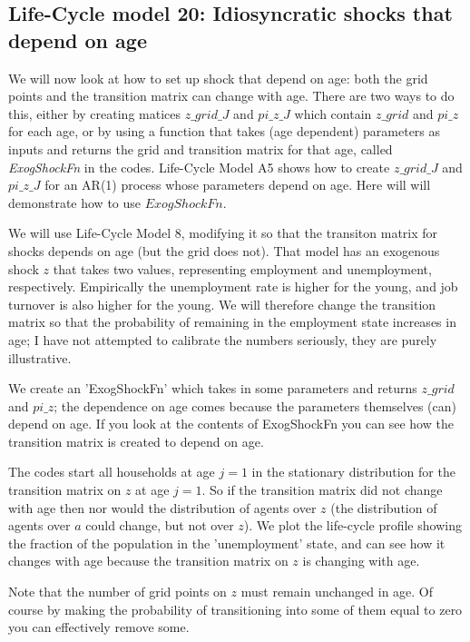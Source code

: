 \subsection{Life-Cycle model 20: Idiosyncratic shocks that depend on age}
We will now look at how to set up shock that depend on age: both the grid points and the transition matrix can change with age. There are two ways to do this, either by creating matices $z\_{}grid\_{}J$ and $pi\_{}z\_{}J$ which contain $z\_{}grid$ and $pi\_{}z$ for each age, or by using a function that takes (age dependent) parameters as inputs and returns the grid and transition matrix for that age, called \textit{ExogShockFn} in the codes. Life-Cycle Model A5 shows how to create $z\_{}grid\_{}J$ and $pi\_{}z\_{}J$ for an AR(1) process whose parameters depend on age. Here will will demonstrate how to use $ExogShockFn$.

We will use Life-Cycle Model 8, modifying it so that the transiton matrix for shocks depends on age (but the grid does not). That model has an exogenous shock $z$ that takes two values, representing employment and unemployment, respectively. Empirically the unemployment rate is higher for the young, and job turnover is also higher for the young. We will therefore change the transition matrix so that the probability of remaining in the employment state increases in age; I have not attempted to calibrate the numbers seriously, they are purely illustrative.

We create an 'ExogShockFn' which takes in some parameters and returns $z\_{}grid$ and $pi\_{}z$; the dependence on age comes because the parameters themselves (can) depend on age. If you look at the contents of ExogShockFn you can see how the transition matrix is created to depend on age.

The codes start all households at age $j=1$ in the stationary distribution for the transition matrix on $z$ at age $j=1$. So if the transition matrix did not change with age then nor would the distribution of agents over $z$ (the distribution of agents over $a$ could change, but not over $z$). We plot the life-cycle profile showing the fraction of the population in the 'unemployment' state, and can see how it changes with age because the transition matrix on $z$ is changing with age.

Note that the number of grid points on $z$ must remain unchanged in age. Of course by making the probability of transitioning into some of them equal to zero you can effectively remove some.

